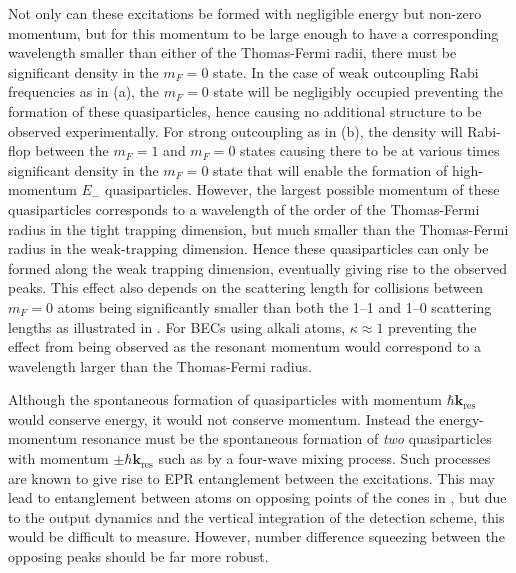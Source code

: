  Not only can these excitations be formed with negligible energy but non-zero momentum, but for this momentum to be large enough to have a corresponding wavelength smaller than either of the Thomas-Fermi radii, there must be significant density in the $m_F=0$ state. In the case of weak outcoupling Rabi frequencies as in (a), the $m_F=0$ state will be negligibly occupied preventing the formation of these quasiparticles, hence causing no additional structure to be observed experimentally. For strong outcoupling as in (b), the density will Rabi-flop between the $m_F=1$ and $m_F=0$ states causing there to be at various times significant density in the $m_F=0$ state that will enable the formation of high-momentum $E_-$ quasiparticles.  However, the largest possible momentum of these quasiparticles corresponds to a wavelength of the order of the Thomas-Fermi radius in the tight trapping dimension, but much smaller than the Thomas-Fermi radius in the weak-trapping dimension. Hence these quasiparticles can only be formed along the weak trapping dimension, eventually giving rise to the observed peaks. This effect also depends on the scattering length for collisions between $m_F=0$ atoms being significantly smaller than both the 1--1 and 1--0 scattering lengths as illustrated in . For BECs using alkali atoms, $\kappa \approx 1$ preventing the effect from being observed as the resonant momentum would correspond to a wavelength larger than the Thomas-Fermi radius.

Although the spontaneous formation of quasiparticles with momentum $\hbar \mathbf{k}_\text{res}$ would conserve energy, it would not conserve momentum. Instead the energy-momentum resonance must be the spontaneous formation of \emph{two} quasiparticles with momentum $\pm \hbar \mathbf{k}_\text{res}$ such as by a four-wave mixing process. Such processes are known to give rise to EPR entanglement between the excitations. This may lead to entanglement between atoms on opposing points of the cones in , but due to the output dynamics and the vertical integration of the detection scheme, this would be difficult to measure. However, number difference squeezing between the opposing peaks should be far more robust.

